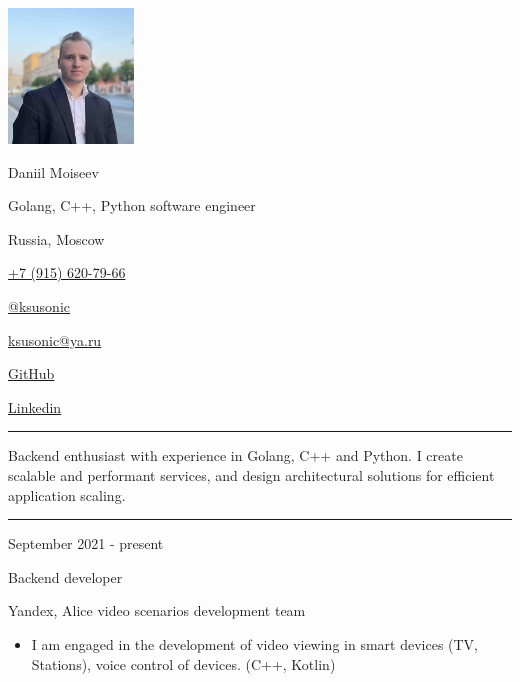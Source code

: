 \documentclass[a4paper,10pt]{article}
\newlength{\cvcolumngapwidth}
\newlength{\cvleftcolumnwidth}
\newlength{\cvrightcolumnwidth}
\newcommand{\cvnamestyle}[1]{{\Large\cvnamefont\textcolor{cvnamecolor}{#1}}}
\newcommand{\cvsectionstyle}[1]{{\normalsize\cvsectionfont\textcolor{cvsectioncolor}{#1}}}
\newcommand{\cvtitlestyle}[1]{{\large\cvtitlefont\textcolor{cvtitlecolor}{#1}}}
\newcommand{\cvdurationstyle}[1]{{\small\cvdurationfont\textcolor{cvdurationcolor}{#1}}}
\newlength{\cvafteritemskipamount}
\newlength{\cvaftersectionskipamount}
\newlength{\cvafternameskipamount}
\newlength{\cvafterpersonalinfolineskipamount}
\newlength{\cvaftertitleskipamount}
\newlength{\cvparskip}
\newcommand{\cvpersonalinfo}[2]{
    \begin{minipage}[t]{\cvleftcolumnwidth}
        \vspace{0mm} %
        \raggedleft #1
    \end{minipage}%
    \hspace{\cvcolumngapwidth}%
    \begin{minipage}[t]{\cvrightcolumnwidth}
        \vspace{0mm} %
        #2
    \end{minipage}

    \vspace{\cvafteritemskipamount}
}
\newcommand{\cvname}[1]{
    \cvnamestyle{#1}

    \vspace{\cvafternameskipamount}
}
\newcommand{\cvpersonalinfolinewithicon}[3]{
    \raisebox{.5\fontcharht\font`E-.5\height}{\texttt{[image: \#2]}}
    #3

    \vspace{\cvafterpersonalinfolineskipamount}
}
\newcommand{\cvsection}[1]{
    \begin{minipage}[t]{\cvleftcolumnwidth}
        \raggedleft\cvsectionstyle{#1}
    \end{minipage}%
    \hspace{\cvcolumngapwidth}%
    \begin{minipage}[t]{\cvrightcolumnwidth}
        \textcolor{cvrulecolor}{\rule{\cvrightcolumnwidth}{0.3mm}}
    \end{minipage}

    \vspace{\cvaftersectionskipamount}
}
\newcommand{\cvitem}[2]{
    \begin{minipage}[t]{\cvleftcolumnwidth}
        \raggedleft #1
    \end{minipage}%
    \hspace{\cvcolumngapwidth}%
    \begin{minipage}[t]{\cvrightcolumnwidth}
        \setlength{\parskip}{\cvparskip} #2
    \end{minipage}

    \vspace{\cvafteritemskipamount}
}
\newcommand{\cvtitle}[1]{
    \cvtitlestyle{#1}

    \vspace{\cvaftertitleskipamount}
    \vspace{-\cvparskip}
}
\begin{document}

\cvpersonalinfo{
    \includegraphics[height=36mm]{img/dan.jpg}
}{
    \cvname{Daniil Moiseev}
    \cvdurationstyle {Golang, C++, Python software engineer}

    \cvpersonalinfolinewithicon{height=4mm}{img/072-location.pdf}{Russia, Moscow}

    \cvpersonalinfolinewithicon{height=4mm}{img/067-phone.pdf}{
        \href{tel:+79156207966}{+7 (915) 620-79-66}
    }

    \cvpersonalinfolinewithicon{height=4mm}{img/telegram.png}{
        \href{https://t.me/ksusonic}{@ksusonic}
    }

    \cvpersonalinfolinewithicon{height=4mm}{img/070-envelop.pdf}{
        \href{mailto:ksusonic@ya.ru}{ksusonic@ya.ru}
    }

    \cvpersonalinfolinewithicon{height=4mm}{img/github.png}{
        \href{https://github.com/ksusonic}{GitHub}
    }

    \cvpersonalinfolinewithicon{height=4mm}{img/linkedin.png}{
        \href{https://www.linkedin.com/in/ksusonic}{Linkedin}
    }
}


\cvsection{Personal information}
\cvitem{
    \cvdurationstyle{}
}{
    Backend enthusiast with experience in Golang, C++ and Python.
    I create scalable and performant services, and design architectural solutions for efficient application scaling.
}


\cvsection{Work experience}

\cvitem{
        \cvdurationstyle{September 2021 - present}
    }{
        \cvtitle{Backend developer}

        Yandex, Alice video scenarios development team

        \begin{itemize}[leftmargin=*]
            \item I am engaged in the development of video viewing in smart devices (TV, Stations), voice control of devices. (C++, Kotlin)
        \end{itemize}
    }
\end{document}
